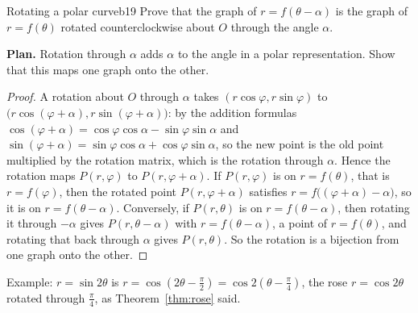 \documentclass[11pt]{article}
\begin{document}
\begin{exmp}{Rotating a polar curve}{b19}
Prove that the graph of $r=f(\theta-\alpha)$ is the graph of $r=f(\theta)$ rotated counterclockwise about $O$ through the angle $\alpha$.

\textbf{Plan.} Rotation through $\alpha$ adds $\alpha$ to the angle in a polar representation. Show that this maps one graph onto the other.

\begin{proof}
A rotation about $O$ through $\alpha$ takes $(r\cos\varphi,r\sin\varphi)$ to $\bigl(r\cos(\varphi+\alpha),r\sin(\varphi+\alpha)\bigr)$: by the addition formulas $\cos(\varphi+\alpha)=\cos\varphi\cos\alpha-\sin\varphi\sin\alpha$ and $\sin(\varphi+\alpha)=\sin\varphi\cos\alpha+\cos\varphi\sin\alpha$, so the new point is the old point multiplied by the rotation matrix, which is the rotation through $\alpha$. Hence the rotation maps $P(r,\varphi)$ to $P(r,\varphi+\alpha)$. If $P(r,\varphi)$ is on $r=f(\theta)$, that is $r=f(\varphi)$, then the rotated point $P(r,\varphi+\alpha)$ satisfies $r=f\bigl((\varphi+\alpha)-\alpha\bigr)$, so it is on $r=f(\theta-\alpha)$. Conversely, if $P(r,\theta)$ is on $r=f(\theta-\alpha)$, then rotating it through $-\alpha$ gives $P(r,\theta-\alpha)$ with $r=f(\theta-\alpha)$, a point of $r=f(\theta)$, and rotating that back through $\alpha$ gives $P(r,\theta)$. So the rotation is a bijection from one graph onto the other.
\end{proof}
Example: $r=\sin2\theta$ is $r=\cos\left(2\theta-\frac\pi2\right)=\cos2\left(\theta-\frac\pi4\right)$, the rose $r=\cos2\theta$ rotated through $\frac\pi4$, as Theorem~\ref{thm:rose} said.
\end{exmp}
\end{document}
